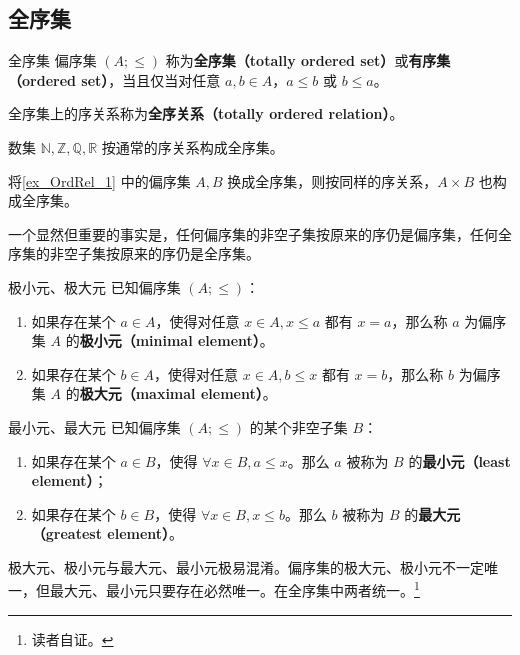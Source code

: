 \subsection{全序集}

\begin{definition}{全序集}
偏序集 $(A;\leq)$ 称为\textbf{全序集（totally ordered set）}或\textbf{有序集（ordered set）}，当且仅当对任意 $a,b \in A$，$a \leq b$ 或 $b \leq a$。
\end{definition}
全序集上的序关系称为\textbf{全序关系（totally ordered relation）}。
\begin{example}{}
数集 $\mathbb{N},\mathbb{Z},\mathbb{Q},\mathbb{R}$ 按通常的序关系构成全序集。
\end{example}
\begin{example}{}
将\autoref{ex_OrdRel_1} 中的偏序集 $A,B$ 换成全序集，则按同样的序关系，$A\times B$ 也构成全序集。
\end{example}

一个显然但重要的事实是，任何偏序集的非空子集按原来的序仍是偏序集，任何全序集的非空子集按原来的序仍是全序集。

\begin{definition}{极小元、极大元}
已知偏序集 $(A;\leq)$：
\begin{enumerate}
\item 如果存在某个 $a \in A$，使得对任意 $x \in A, x\leq a$ 都有 $x = a$，那么称 $a$ 为偏序集 $A$ 的\textbf{极小元（minimal element）}。
\item 如果存在某个 $b \in A$，使得对任意 $x \in A, b\leq x$ 都有 $x = b$，那么称 $b$ 为偏序集 $A$ 的\textbf{极大元（maximal element）}。
\end{enumerate}
\end{definition}

\begin{definition}{最小元、最大元}
已知偏序集 $(A;\leq)$ 的某个非空子集 $B$：
\begin{enumerate}
\item 如果存在某个 $a \in B$，使得 $\forall x \in B, a \leq x$。那么 $a$ 被称为 $B$ 的\textbf{最小元（least element）}；
\item 如果存在某个 $b \in B$，使得 $\forall x \in B, x \leq b$。那么 $b$ 被称为 $B$ 的\textbf{最大元（greatest element）}。
\end{enumerate}
\end{definition}

极大元、极小元与最大元、最小元极易混淆。偏序集的极大元、极小元不一定唯一，但最大元、最小元只要存在必然唯一。在全序集中两者统一。\footnote{读者自证。}

